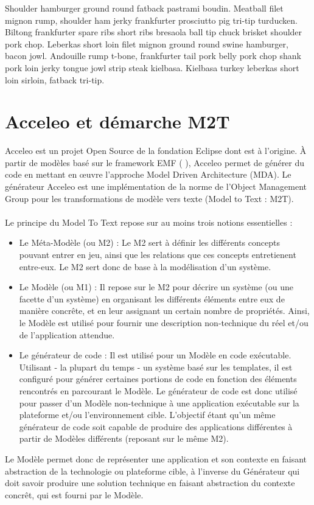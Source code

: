 Shoulder hamburger ground round fatback pastrami boudin. Meatball filet mignon rump, shoulder ham jerky frankfurter prosciutto pig tri-tip turducken. Biltong frankfurter spare ribs short ribs bresaola ball tip chuck brisket shoulder pork chop. Leberkas short loin filet mignon ground round swine hamburger, bacon jowl. Andouille rump t-bone, frankfurter tail pork belly pork chop shank pork loin jerky tongue jowl strip steak kielbasa. Kielbasa turkey leberkas short loin sirloin, fatback tri-tip.


\section{Acceleo et démarche M2T}
Acceleo est un projet Open Source de la fondation Eclipse dont \kwobeo{} est à l'origine. À partir de modèles basé sur le framework EMF (\cf{} \cite{emf}), Acceleo permet de générer du code en mettant en œuvre l'approche Model Driven Architecture (MDA). Le générateur Acceleo est une implémentation de la norme de l'Object Management Group \cite{omg} pour les transformations de modèle vers texte (Model to Text : M2T).
\\\\
Le principe du Model To Text repose sur au moins trois notions essentielles :
\begin{itemize}
\item Le Méta-Modèle (ou M2) : Le M2 sert à définir les différents concepts pouvant entrer en jeu, ainsi que les relations que ces concepts entretienent entre-eux. Le M2 sert donc de base à la modélisation d'un système.
\item Le Modèle (ou M1) : Il repose sur le M2 pour décrire un système (ou une facette d'un système) en organisant les différents éléments entre eux de manière concrête, et en leur assignant un certain nombre de propriétés. Ainsi, le Modèle est utilisé pour fournir une description non-technique du réel et/ou de l'application attendue.
\item Le générateur de code : Il est utilisé pour  un Modèle en code exécutable. Utilisant - la plupart du temps - un système basé sur les templates, il est configuré pour générer certaines portions de code en fonction des éléments rencontrés en parcourant le Modèle. Le générateur de code est donc utilisé pour passer d'un Modèle non-technique à une application exécutable sur la plateforme et/ou l'environnement cible. L'objectif étant qu'un même générateur de code soit capable de produire des applications différentes à partir de Modèles différents (reposant sur le même M2).\\
\end{itemize}

Le Modèle permet donc de représenter une application et son contexte en faisant abstraction de la technologie ou plateforme cible, à l'inverse du Générateur qui doit savoir produire une solution technique en faisant abstraction du contexte concrêt, qui est fourni par le Modèle.




